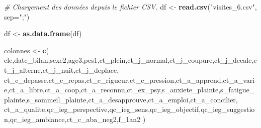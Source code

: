 \documentclass[
]{article}
\newenvironment{Shaded}{\begin{snugshade}}{\end{snugshade}}
\newcommand{\AttributeTok}[1]{\textcolor[rgb]{0.13,0.29,0.53}{#1}}
\newcommand{\CommentTok}[1]{\textcolor[rgb]{0.56,0.35,0.01}{\textit{#1}}}
\newcommand{\FunctionTok}[1]{\textcolor[rgb]{0.13,0.29,0.53}{\textbf{#1}}}
\newcommand{\NormalTok}[1]{#1}
\newcommand{\OtherTok}[1]{\textcolor[rgb]{0.56,0.35,0.01}{#1}}
\newcommand{\StringTok}[1]{\textcolor[rgb]{0.31,0.60,0.02}{#1}}
\begin{document}
\begin{Shaded}
\begin{Highlighting}[]
\CommentTok{\# Chargement des données depuis le fichier CSV.}
\NormalTok{df }\OtherTok{\textless{}{-}} \FunctionTok{read.csv}\NormalTok{(}\StringTok{"visites\_6.csv"}\NormalTok{, }\AttributeTok{sep=}\StringTok{";"}\NormalTok{)}

\NormalTok{df }\OtherTok{\textless{}{-}} \FunctionTok{as.data.frame}\NormalTok{(df)}

\NormalTok{colonnes }\OtherTok{\textless{}{-}} \FunctionTok{c}\NormalTok{(}
  \StringTok{\textquotesingle{}cle\textquotesingle{}}\NormalTok{,}\StringTok{\textquotesingle{}date\_bilan\textquotesingle{}}\NormalTok{,}\StringTok{\textquotesingle{}sexe2\textquotesingle{}}\NormalTok{,}\StringTok{\textquotesingle{}age3\textquotesingle{}}\NormalTok{,}\StringTok{\textquotesingle{}pcs1\textquotesingle{}}\NormalTok{,}\StringTok{\textquotesingle{}ct\_plein\textquotesingle{}}\NormalTok{,}\StringTok{\textquotesingle{}ct\_j\_normal\textquotesingle{}}\NormalTok{,}\StringTok{\textquotesingle{}ct\_j\_coupure\textquotesingle{}}\NormalTok{,}\StringTok{\textquotesingle{}ct\_j\_decale\textquotesingle{}}\NormalTok{,}\StringTok{\textquotesingle{}ct\_j\_alterne\textquotesingle{}}\NormalTok{,}\StringTok{\textquotesingle{}ct\_j\_nuit\textquotesingle{}}\NormalTok{,}\StringTok{\textquotesingle{}ct\_j\_deplace\textquotesingle{}}\NormalTok{,}
  \StringTok{\textquotesingle{}ct\_c\_depasse\textquotesingle{}}\NormalTok{,}\StringTok{\textquotesingle{}ct\_c\_repas\textquotesingle{}}\NormalTok{,}\StringTok{\textquotesingle{}ct\_c\_rigueur\textquotesingle{}}\NormalTok{,}\StringTok{\textquotesingle{}ct\_c\_pression\textquotesingle{}}\NormalTok{,}\StringTok{\textquotesingle{}ct\_a\_apprend\textquotesingle{}}\NormalTok{,}\StringTok{\textquotesingle{}ct\_a\_varie\textquotesingle{}}\NormalTok{,}\StringTok{\textquotesingle{}ct\_a\_libre\textquotesingle{}}\NormalTok{,}\StringTok{\textquotesingle{}ct\_a\_coop\textquotesingle{}}\NormalTok{,}\StringTok{\textquotesingle{}ct\_a\_reconnu\textquotesingle{}}\NormalTok{,}\StringTok{\textquotesingle{}ct\_ex\_psy\textquotesingle{}}\NormalTok{,}\StringTok{\textquotesingle{}s\_anxiete\_plainte\textquotesingle{}}\NormalTok{,}\StringTok{\textquotesingle{}s\_fatigue\_plainte\textquotesingle{}}\NormalTok{,}\StringTok{\textquotesingle{}s\_sommeil\_plainte\textquotesingle{}}\NormalTok{,}\StringTok{\textquotesingle{}ct\_a\_desapprouve\textquotesingle{}}\NormalTok{,}\StringTok{\textquotesingle{}ct\_a\_emploi\textquotesingle{}}\NormalTok{,}\StringTok{\textquotesingle{}ct\_a\_concilier\textquotesingle{}}\NormalTok{,}
  \StringTok{\textquotesingle{}ct\_a\_qualite\textquotesingle{}}\NormalTok{,}\StringTok{\textquotesingle{}qc\_ieg\_perspective\textquotesingle{}}\NormalTok{,}\StringTok{\textquotesingle{}qc\_ieg\_sens\textquotesingle{}}\NormalTok{,}\StringTok{\textquotesingle{}qc\_ieg\_objectif\textquotesingle{}}\NormalTok{,}\StringTok{\textquotesingle{}qc\_ieg\_suggestion\textquotesingle{}}\NormalTok{,}\StringTok{\textquotesingle{}qc\_ieg\_ambiance\textquotesingle{}}\NormalTok{,}\StringTok{\textquotesingle{}ct\_c\_aba\_neg2\textquotesingle{}}\NormalTok{,}\StringTok{\textquotesingle{}f\_1an2\textquotesingle{}}
\NormalTok{)}


\end{Highlighting}
\end{Shaded}
\end{document}
